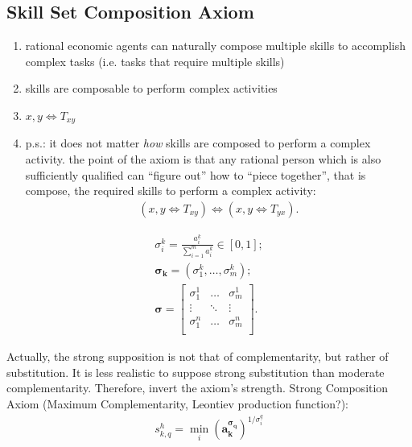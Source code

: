 \documentclass{elsarticle} %
\begin{document}
\subsection{Skill Set Composition Axiom}
\begin{enumerate}
    \item rational economic agents can naturally compose multiple skills to accomplish
          complex tasks (i.e. tasks that require multiple skills)
    \item skills are composable to perform complex activities
    \item $x,y \iff T_{xy}$
    \item p.s.: it does not matter \textit{how} skills are composed to perform a complex
          activity. the point of the axiom is that any rational person which is also
          sufficiently qualified can ``figure out'' how to ``piece together'', that is
          compose, the required skills to perform a complex activity:
          \begin{gather*}
              (x,y \iff T_{xy}) \iff (x,y \iff T_{yx})
              .
          \end{gather*}
\end{enumerate}

\begin{gather*}
    \sigma_{i}^{k} = 
    \frac{
        a_{i}^{k}
        }{
            \sum_{i=1}^{m}{
                a_{i}^{k}
            }
        }
        \in [0,1]
        ;\\
    \boldsymbol{\sigma_{k}} = 
    (\sigma_{1}^{k}, \dots, \sigma_{m}^{k})
    ;\\
    \boldsymbol{\sigma} =
    \begin{bmatrix}
        \sigma_{1}^{1} & \hdots & \sigma_{m}^{1} \\
        \vdots    & \ddots & \vdots    \\
        \sigma_{1}^{n} & \hdots & \sigma_{m}^{n} \\
    \end{bmatrix}
    .
\end{gather*}

Actually, the strong supposition is not that of complementarity, but rather of substitution. It is less realistic to suppose strong substitution than moderate complementarity. Therefore, invert the axiom's strength.
Strong Composition Axiom (Maximum Complementarity, Leontiev production function?):
\begin{gather*}
    s_{k,q}^{h} = 
    {\min_{i}\left(
        {\boldsymbol{a_{k}^ {\boldsymbol{\sigma_{q}}}}}
    \right)} ^ {1 / \sigma_{i}^{q}}
\end{gather*}
\end{document}
